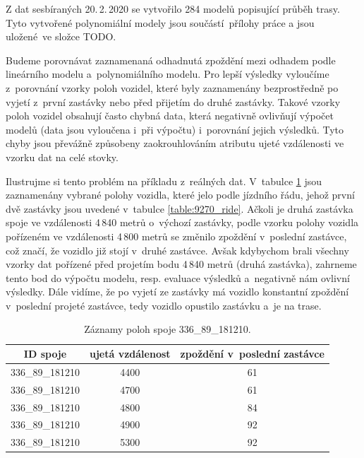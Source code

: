 \bigbreak

Z dat sesbíraných 20.\,2.\,2020 se vytvořilo 284 modelů popisující průběh trasy. Tyto vytvořené polynomiální modely jsou součástí přílohy práce a jsou uložené ve složce TODO.


\bigbreak

Budeme porovnávat zaznamenaná odhadnutá zpoždění mezi odhadem podle lineárního modelu a~polynomiálního modelu. Pro lepší výsledky vyloučíme z~porovnání vzorky poloh vozidel, které byly zaznamenány bezprostředně po vyjetí z~první zastávky nebo před přijetím do druhé zastávky. Takové vzorky poloh vozidel obsahují často chybná data, která negativně ovlivňují výpočet modelů (data jsou vyloučena i~při výpočtu) i~porovnání jejich výsledků. Tyto chyby jsou převážně způsobeny zaokrouhlováním atributu ujeté vzdálenosti ve vzorku dat na celé stovky.

\bigbreak

Ilustrujme si tento problém na příkladu z~reálných dat. V~tabulce \ref{table:9270_samples} jsou zaznamenány vybrané polohy vozidla, které jelo podle jízdního řádu, jehož první dvě zastávky jsou uvedené v~tabulce \ref{table:9270_ride}. Ačkoli je druhá zastávka spoje ve vzdálenosti 4\,840 metrů o~výchozí zastávky, podle vzorku polohy vozidla pořízeném ve vzdálenosti 4\,800 metrů se změnilo zpoždění v~poslední zastávce, což značí, že vozidlo již stojí v~druhé zastávce. Avšak kdybychom brali všechny vzorky dat pořízené před projetím bodu 4\,840 metrů (druhá zastávka), zahrneme tento bod do výpočtu modelu, resp. evaluace výsledků a~negativně nám ovlivní výsledky. Dále vidíme, že po vyjetí ze zastávky má vozidlo konstantní zpoždění v~poslední projeté zastávce, tedy vozidlo opustilo zastávku a~je na trase.

\begin{center}
   \begin{table}[ht]
\centering
\begin{tabular}{|c|c|c|}
\hline
ID spoje & ujetá vzdálenost & zpoždění v~poslední zastávce \\ \hline \hline
336\_89\_181210 & 4400 & 61 \\ \hline
336\_89\_181210 & 4700 & 61 \\ \hline
336\_89\_181210 & 4800 & 84 \\ \hline
336\_89\_181210 & 4900 & 92 \\ \hline
336\_89\_181210 & 5300 & 92 \\ \hline
\end{tabular}
\label{table:9270_samples}
\caption{Záznamy poloh spoje 336\_89\_181210.}
\end{table}
\end{center}


